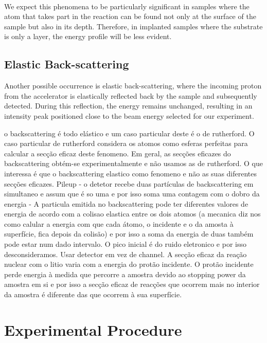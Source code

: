 \documentclass{article}
\begin{document}
\begin{multicols}{2}
\paragraph{}
We expect this phenomena to be particularly significant in samples where the atom that takes part in the reaction can be found not only at the surface of the sample but also in its depth. Therefore, in implanted samples where the substrate is only a layer, the energy profile will be less evident.

\subsection{Elastic Back-scattering}
    \label{sec:elastic_back}

Another possible occurrence is elastic back-scattering, where the incoming proton from the accelerator is elastically reflected back by the sample and subsequently detected. During this reflection, the energy remains unchanged, resulting in an intensity peak positioned close to the beam energy selected for our experiment.

o backscattering é todo elástico e um caso particular deste é o de rutherford. O caso particular de rutherford considera os atomos como esferas perfeitas para calcular a secção eficaz deste fenomeno. Em geral, as secções eficazes do backscattering obtém-se experimentalmente e não usamos as de rutherford. O que interessa é que o backscattering elastico como fenomeno e não as suas diferentes secções eficazes. Pileup - o detetor recebe duas partículas de backscattering em simultaneo e assum que é so uma e por isso soma uma contagem com o dobro da energia - A particula emitida no backscattering pode ter diferentes valores de energia de acordo com a colisao elastica entre os dois atomos (a mecanica diz nos como calular a energia com que cada átomo, o incidente e o da amosta à superfície, fica depois da colisão) e por isso a soma da energia de duas também pode estar num dado intervalo. O pico inicial é do ruido eletronico e por isso desconsideramos. Usar detector em vez de channel. 
A secção eficaz da reação nuclear com o litio varia com a energia do protão incidente. O protão incidente perde energia à medida que percorre a amostra devido ao stopping power da amostra em si e por isso a secção eficaz de reacções que ocorrem mais no interior da amostra é diferente das que ocorrem à sua superfície.


\section{Experimental Procedure}
    \label{sec:experimentalprocedure}


\end{multicols}
\end{document}
